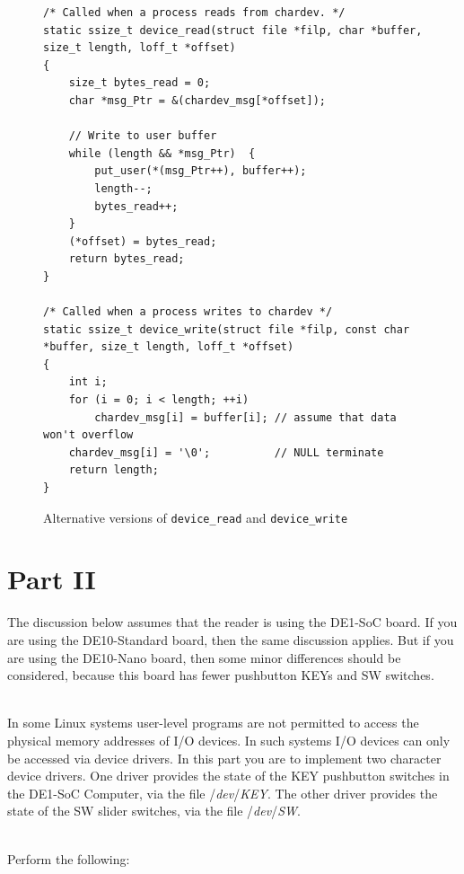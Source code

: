 \documentclass[epsfig,10pt,fullpage]{article}
\begin{document}
\lstset{language=C}
\begin{figure}[H]
\begin{center}
\begin{minipage}[t]{15 cm}
\begin{lstlisting}[name=alternate]
/* Called when a process reads from chardev. */
static ssize_t device_read(struct file *filp, char *buffer, size_t length, loff_t *offset)
{
	size_t bytes_read = 0;
	char *msg_Ptr = &(chardev_msg[*offset]);
	
	// Write to user buffer
	while (length && *msg_Ptr)  {
		put_user(*(msg_Ptr++), buffer++);
		length--;
		bytes_read++;
	}
	(*offset) = bytes_read;
	return bytes_read;
}

/* Called when a process writes to chardev */
static ssize_t device_write(struct file *filp, const char *buffer, size_t length, loff_t *offset)
{
	int i;
	for (i = 0; i < length; ++i)
		chardev_msg[i] = buffer[i];	// assume that data won't overflow
	chardev_msg[i] = '\0'; 			// NULL terminate
	return length;
}
\end{lstlisting}
\end{minipage}
\caption{Alternative versions of \texttt{device\_read} and \texttt{device\_write}}
\label{fig:alternate}
\end{center}
\end{figure}

\vspace{-1cm}
\section*{Part II}
\noindent
The discussion below assumes that the reader is using the DE1-SoC board. If you are using
the DE10-Standard board, then the same discussion applies. But if you are using the
DE10-Nano board, then some minor differences should be considered, because this 
board has fewer pushbutton KEYs and SW switches. 

~\\
\noindent
In some Linux systems user-level programs are not permitted to access the physical memory 
addresses of I/O devices. In such systems I/O devices can only be accessed via device
drivers. In this part you are to implement two character device drivers. One driver provides the
state of the KEY pushbutton switches in the DE1-SoC Computer, via the file 
/{\it dev}/{\it KEY}. The other driver provides the state of the SW slider switches, via
the file /{\it dev}/{\it SW}.

~\\
\noindent
Perform the following:
\end{document}
